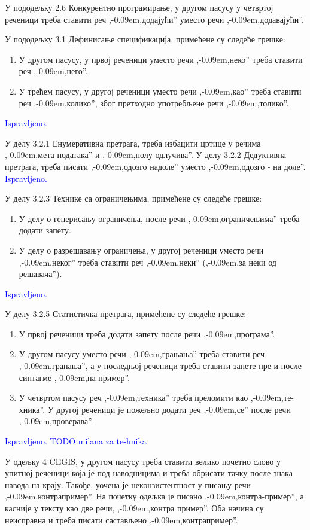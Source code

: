 \documentclass[a4paper]{report}
\newcommand{\odgovor}[1]{\textcolor{blue}{#1}}
\def\zn{,\kern-0.09em,}
\begin{document}
\par У пододељку 2.6 Конкурентно програмирање, у другом пасусу у четвртој реченици треба ставити реч \zn додајући'' уместо речи \zn додавајући''.

\par У пододељку 3.1 Дефинисање спецификација, примећене су следеће грешке:
\begin{enumerate}
\item У другом пасусу, у првој реченици уместо речи \zn неко'' треба ставити реч \zn него''.
\item У трећем пасусу, у другој реченици уместо речи \zn као'' треба ставити реч \zn колико'', због претходно употребљене речи \zn толико''.
\end{enumerate}
\odgovor {Ispravljeno.}

\par У делу 3.2.1 Енумеративна претрага, треба избацити цртице у речима \zn мета-података'' и \zn полу-одлучива''. У делу 3.2.2 Дедуктивна претрага, треба писати \zn одозго надоле'' уместо \zn одозго - на доле''.
\odgovor {Ispravljeno.}

\par У делу 3.2.3 Технике са ограничењима, примећене су следеће грешке:
\begin{enumerate}
\item У делу о генерисању ограничења, после речи \zn ограничењима'' треба додати запету.
\item У делу о разрешавању ограничења, у другој реченици уместо речи \zn неког'' треба ставити реч \zn неки'' (\zn за неки од решавача'').
\end{enumerate}
\odgovor {Ispravljeno.}

\par У делу 3.2.5 Статистичка претрага, примећене су следеће грешке:
\begin{enumerate}
\item У првој реченици треба додати запету после речи \zn програма''.
\item У другом пасусу уместо речи \zn грањања'' треба ставити реч \zn гранања'', а у последњој реченици треба ставити запете пре и после синтагме \zn на пример''.
\item У четвртом пасусу реч \zn техника'' треба преломити као \zn те-хника''. У другој реченици је пожељно додати реч \zn се'' после речи \zn проверава''.
\end{enumerate}
\odgovor {Ispravljeno. TODO milana za te-hnika}

\par У одељку 4 CEGIS, у другом пасусу треба ставити велико почетно слово у упитној реченици која је под наводницима и треба обрисати тачку после знака навода на крају. Такође, уочена је неконзистентност у писању речи \zn контрапример''. На почетку одељка је писано \zn контра-пример'', а касније у тексту као две речи, \zn контра пример''. Оба начина су неисправна и треба писати састављено \zn контрапример''.
\end{document}
